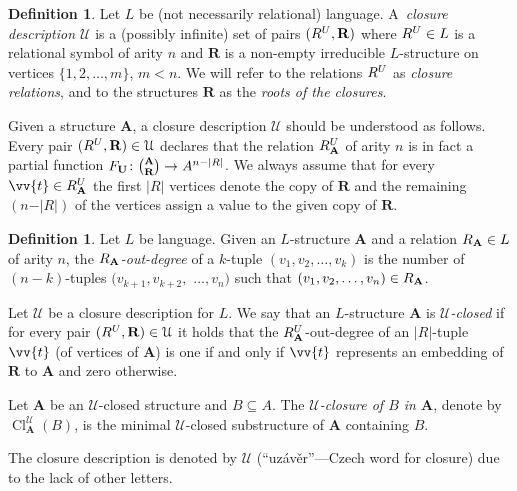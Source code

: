\documentclass{elsarticle}
\def\Cl{\mathop{\mathrm{Cl}}\nolimits}
\def\str#1{\mathbf {#1}}
\def\nbrel#1#2{R\ifstrempty{#1}{}{_{#1}}\ifstrempty{#2}{}{^{#2}}}
\def\rel#1#2{\nbrel{\ifstrempty{#1}{}{\str{#1}}}{#2}}
\def\func#1#2{\nbfunc{\ifstrempty{#1}{}{\str{#1}}}{#2}}
\def\nbfunc#1#2{F\ifstrempty{#1}{}{_{#1}}\ifstrempty{#2}{}{^{#2}}}
\theoremstyle{plain}
\theoremstyle{definition}
\newtheorem{definition}[theorem]{Definition}
\theoremstyle{remark}
\begin{document}
\begin{definition}
\label{def:closuredesc}
Let $L$ be (not necessarily relational) language.
A~\emph{closure description $\mathcal U$} is a (possibly infinite) set of pairs $(\rel{}{U},\str{R})$ where
$\rel{}{U}\in L$ is a relational symbol of arity $n$ and $\str{R}$ is a non-empty irreducible $L$-structure on vertices $\{1,2,\ldots, m\}$, $m< n$.
We will refer to the relations $\rel{}{U}$ as \emph{closure relations}, and to the structures $\str{R}$ as the \emph{roots of the closures}.
\end{definition}
Given a structure $\str{A}$, a closure description $\mathcal U$ should be understood as follows.
Every pair $(\rel{}{U},\str{R})\in \mathcal U$ declares that the relation $\rel{A}{U}$  of arity $n$ is in fact a partial function $\func{U}{}\colon {\str{A}\choose \str{R}}\to A^{n-|R|}$.
We always assume that
for every $\vv{t}\in \rel{A}{U}$ the first $\vert R\vert $ vertices denote the copy of $\str{R}$ and the remaining $(n-\vert R\vert )$
of the vertices assign a value to the given copy of $\str{R}$.
\begin{definition}
\label{def:uclosed}
Let $L$ be language.
Given an $L$-structure $\str{A}$ and a relation $\rel{A}{}\in L$ of arity $n$,
the \emph{$\rel{A}{}$-out-degree} of
a $k$-tuple $(v_1,v_2,\ldots, v_{k})$ is the number of $(n-k)$-tuples $(v_{k+1},v_{k+2},$ $\ldots, v_{n})$ such that
$(v_1,v_2,\ldots, v_n)\in \rel{A}{}$.

Let $\mathcal U$ be a closure description for $L$.
We say that an $L$-structure $\str{A}$ is \emph{$\mathcal U$-closed} if for every pair $(\rel{}{U},\str{R})\in \mathcal U$
it holds that the $\rel{A}{U}$-out-degree of an $\vert R\vert $-tuple $\vv{t}$ (of vertices of $\str{A}$) is one if and only if $\vv{t}$ represents an embedding of $\str{R}$ to $\str{A}$ and zero otherwise.

Let $\str{A}$ be an  $\mathcal U$-closed structure and $B\subseteq A$. The \emph{$\mathcal U$-closure of $B$ in $\str{A}$},
denote by $\Cl^\mathcal U_\str{A}(B)$,
is the minimal $\mathcal U$-closed substructure of $\str{A}$ containing
$B$.
\end{definition}
The closure description is denoted by $\mathcal U$ (``uz\'av\v er''---Czech word for closure) due to the lack of other letters.
\end{document}
